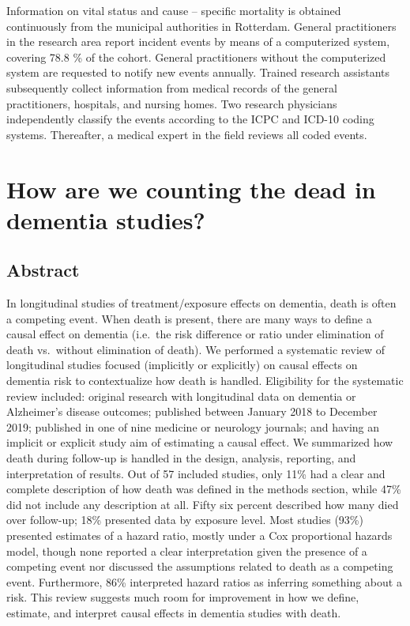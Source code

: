 \documentclass[
]{book}
\begin{document}
Information on vital status and cause -- specific mortality is obtained continuously from the municipal authorities in Rotterdam. General practitioners in the research area report incident events by means of a computerized system, covering 78.8 \% of the cohort. General practitioners without the computerized system are requested to notify new events annually. Trained research assistants subsequently collect information from medical records of the general practitioners, hospitals, and nursing homes. Two research physicians independently classify the events according to the ICPC and ICD-10 coding systems. Thereafter, a medical expert in the field reviews all coded events.

\hypertarget{chapter5}{%
\chapter{How are we counting the dead in dementia studies?}\label{chapter5}}


\newpage

\hypertarget{abstract-3}{%
\section{Abstract}\label{abstract-3}}

In longitudinal studies of treatment/exposure effects on dementia, death is often a competing event. When death is present, there are many ways to define a causal effect on dementia (i.e.~the risk difference or ratio under elimination of death vs.~without elimination of death). We performed a systematic review of longitudinal studies focused (implicitly or explicitly) on causal effects on dementia risk to contextualize how death is handled. Eligibility for the systematic review included: original research with longitudinal data on dementia or Alzheimer's disease outcomes; published between January 2018 to December 2019; published in one of nine medicine or neurology journals; and having an implicit or explicit study aim of estimating a causal effect. We summarized how death during follow-up is handled in the design, analysis, reporting, and interpretation of results. Out of 57 included studies, only 11\% had a clear and complete description of how death was defined in the methods section, while 47\% did not include any description at all. Fifty six percent described how many died over follow-up; 18\% presented data by exposure level. Most studies (93\%) presented estimates of a hazard ratio, mostly under a Cox proportional hazards model, though none reported a clear interpretation given the presence of a competing event nor discussed the assumptions related to death as a competing event. Furthermore, 86\% interpreted hazard ratios as inferring something about a risk. This review suggests much room for improvement in how we define, estimate, and interpret causal effects in dementia studies with death.
\end{document}

